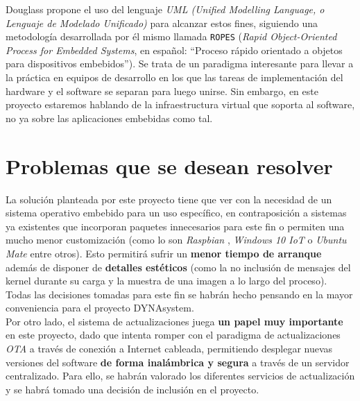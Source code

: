 Douglass propone el uso del lenguaje \textit{UML (Unified Modelling Language, o Lenguaje de Modelado Unificado)} para alcanzar estos fines, siguiendo una metodología desarrollada por él mismo llamada \texttt{ROPES} (\textit{Rapid Object-Oriented Process for Embedded Systems}, en español: ``Proceso rápido orientado a objetos para dispositivos embebidos''). Se trata de un paradigma interesante para llevar a la práctica en equipos de desarrollo en los que las tareas de implementación del hardware y el software se separan para luego unirse. Sin embargo, en este proyecto estaremos hablando de la infraestructura virtual que soporta al software, no ya sobre las aplicaciones embebidas como tal.

\section{Problemas que se desean resolver}

La solución planteada por este proyecto tiene que ver con la necesidad de un sistema operativo embebido para un uso específico, en contraposición a sistemas ya existentes que incorporan paquetes innecesarios para este fin o permiten una mucho menor customización (como lo son \textit{Raspbian} \cite{raspbian}, \textit{Windows 10 IoT} \cite{windows-10-iot} o \textit{Ubuntu Mate} \cite{ubuntu-mate-raspberry} entre otros). Esto permitirá sufrir un \textbf{menor tiempo de arranque} además de disponer de \textbf{detalles estéticos} (como la no inclusión de mensajes del kernel durante su carga y la muestra de una imagen a lo largo del proceso). Todas las decisiones tomadas para este fin se habrán hecho pensando en la mayor conveniencia para el proyecto DYNAsystem.\\

Por otro lado, el sistema de actualizaciones juega \textbf{un papel muy importante} en este proyecto, dado que intenta romper con el paradigma de actualizaciones \textit{OTA} a través de conexión a Internet cableada, permitiendo desplegar nuevas versiones del software \textbf{de forma inalámbrica y segura} a través de un servidor centralizado. Para ello, se habrán valorado los diferentes servicios de actualización y se habrá tomado una decisión de inclusión en el proyecto.

\newpage

